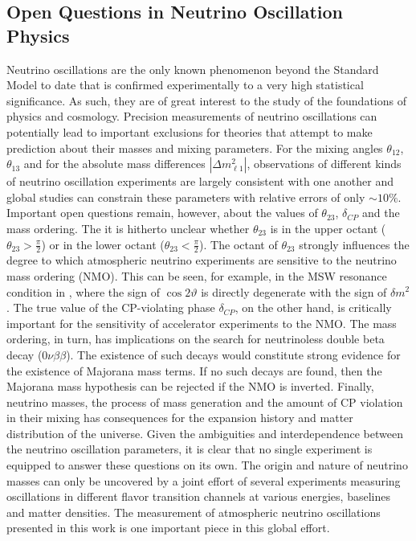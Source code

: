\subsection{Open Questions in Neutrino Oscillation Physics}
Neutrino oscillations are the only known phenomenon beyond the Standard Model to date that is confirmed experimentally to a very high statistical significance. As such, they are of great interest to the study of the foundations of physics and cosmology. Precision measurements of neutrino oscillations can potentially lead to important exclusions for theories that attempt to make prediction about their masses and mixing parameters. For the mixing angles $\theta_{12}$, $\theta_{13}$ and for the absolute mass differences $|\Delta m^2_{\ell 1}|$, observations of different kinds of neutrino oscillation experiments are largely consistent with one another and global studies can constrain these parameters with relative errors of only $\sim{10\%}$\cite{Esteban:2020cvm}. Important open questions remain, however, about the values of $\theta_{23}$, $\delta_{CP}$ and the mass ordering. The it is hitherto unclear whether $\theta_{23}$ is in the upper octant ($\theta_{23} > \frac{\pi}{2}$) or in the lower octant ($\theta_{23} < \frac{\pi}{2}$). The octant of $\theta_{23}$ strongly influences the degree to which atmospheric neutrino experiments are sensitive to the neutrino mass ordering (NMO). This can be seen, for example, in the MSW resonance condition in , where the sign of $\cos{2\vartheta}$ is directly degenerate with the sign of $\delta m^2$. The true value of the CP-violating phase $\delta_{CP}$, on the other hand, is critically important for the sensitivity of accelerator experiments to the NMO. The mass ordering, in turn, has implications on the search for neutrinoless double beta decay ($0\nu\beta\beta$). The existence of such decays would constitute strong evidence for the existence of Majorana mass terms. If no such decays are found, then the Majorana mass hypothesis can be rejected if the NMO is inverted.
Finally, neutrino masses, the process of mass generation and the amount of CP violation in their mixing has consequences for the expansion history and matter distribution of the universe.
Given the ambiguities and interdependence between the neutrino oscillation parameters, it is clear that no single experiment is equipped to answer these questions on its own. The origin and nature of neutrino masses can only be uncovered by a joint effort of several experiments measuring oscillations in different flavor transition channels at various energies, baselines and matter densities. The measurement of atmospheric neutrino oscillations presented in this work is one important piece in this global effort.